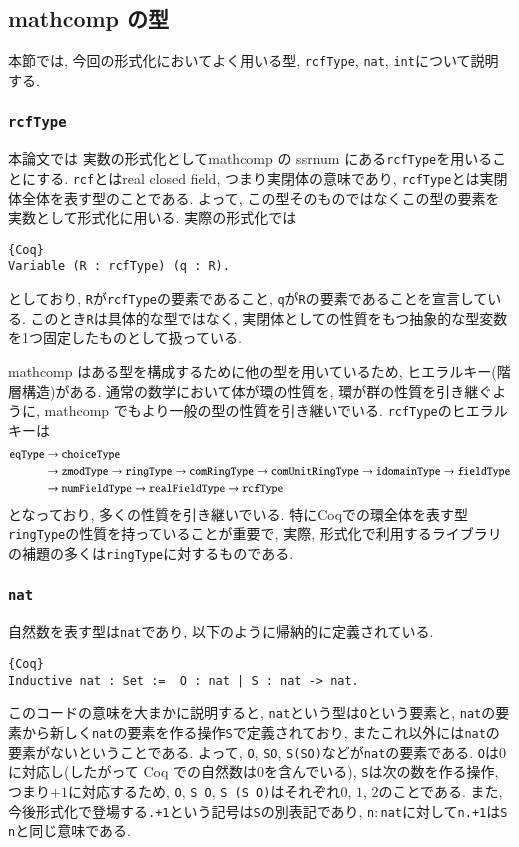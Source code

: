 \documentclass[11pt]{jsreport}
\theoremstyle{mystyle}
\newcommand{\0}{\textbf{0}}
\begin{document}
\subsection{mathcomp の型}
本節では, 今回の形式化においてよく用いる型, {\tt rcfType}, {\tt nat}, {\tt int}について説明する. 
\subsubsection*{\tt rcfType}
本論文では 実数の形式化としてmathcomp の ssrnum にある{\tt rcfType}を用いることにする. {\tt rcf}とはreal closed field, つまり実閉体の意味であり, {\tt rcfType}とは実閉体全体を表す型のことである. よって, この型そのものではなくこの型の要素を実数として形式化に用いる. 実際の形式化では
\begin{lstlisting}{Coq}
Variable (R : rcfType) (q : R). \end{lstlisting}
としており, {\tt R}が{\tt rcfType}の要素であること, {\tt q}が{\tt R}の要素であることを宣言している. このとき{\tt R}は具体的な型ではなく, 実閉体としての性質をもつ抽象的な型変数を1つ固定したものとして扱っている.

mathcomp はある型を構成するために他の型を用いているため, ヒエラルキー(階層構造)がある. 通常の数学において体が環の性質を, 環が群の性質を引き継ぐように, mathcomp でもより一般の型の性質を引き継いでいる. {\tt rcfType}のヒエラルキーは
\begin{align*}
  {\tt eqType} &\to {\tt choiceType} \\
                   &\to {\tt zmodType} \to {\tt ringType} \to 
                          {\tt comRingType} \to {\tt comUnitRingType} \to 
                          {\tt idomainType} \to {\tt fieldType}\\
                   &\to {\tt numFieldType} \to {\tt realFieldType} \to {\tt rcfType}
\end{align*}
となっており, 多くの性質を引き継いでいる. 特にCoqでの環全体を表す型{\tt ringType}の性質を持っていることが重要で, 実際, 形式化で利用するライブラリの補題の多くは{\tt ringType}に対するものである.
\subsubsection*{\tt nat}
自然数を表す型は{\tt nat}であり, 以下のように帰納的に定義されている. 
\begin{lstlisting}{Coq}
Inductive nat : Set :=  O : nat | S : nat -> nat. \end{lstlisting}
このコードの意味を大まかに説明すると, {\tt nat}という型は{\tt O}という要素と, {\tt nat}の要素から新しく{\tt nat}の要素を作る操作{\tt S}で定義されており, またこれ以外には{\tt nat}の要素がないということである. よって, {\tt O}, {\tt SO}, {\tt S(SO)}などが{\tt nat}の要素である. 
{\tt O}は$0$に対応し(したがって Coq での自然数は$0$を含んでいる), {\tt S}は次の数を作る操作, つまり$+1$に対応するため, {\tt O}, {\tt S O}, {\tt S (S O)}はそれぞれ$0$, $1$, $2$のことである. また, 今後形式化で登場する{\tt .+1}という記号は{\tt S}の別表記であり, 
{\tt n$\colon$nat}に対して{\tt n.+1}は{\tt S n}と同じ意味である. 
\end{document}
